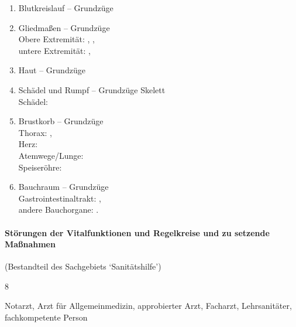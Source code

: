   \begin{enumerate}
    \item    Blutkreislauf -- Grundzüge \dotfill {}
    \item    Gliedmaßen -- Grundzüge
    \\
    Obere Extremität: \dotfill {},
    ,
    \\
    untere Extremität: \dotfill {},
    \item    Haut -- Grundzüge \dotfill {}
    \item    Schädel und Rumpf -- Grundzüge Skelett
    \\
    Schädel:  \dotfill {}
    \item    Brustkorb -- Grundzüge
    \\
    Thorax:  \dotfill {}, \\
    Herz:  \dotfill {} \\
    Atemwege/Lunge:  \dotfill {}\\
    Speiseröhre:  \dotfill {}
    \item    Bauchraum -- Grundzüge
    \\
    Gastrointestinaltrakt: \dotfill
    , \\
    andere Bauchorgane: \dotfill
    .
  \end{enumerate}
  

\paragraph{Störungen der  Vitalfunktionen  und Regelkreise und zu setzende Maßnahmen}
(Bestandteil des  Sachgebiets  \enquote*{Sanitätshilfe})
  
  \begin{inparadesc}
    \item[Stundenanzahl:]  8
    \item[Lehrkraft:]  Notarzt, Arzt für Allgemeinmedizin, approbierter Arzt,
    Facharzt,  Lehrsanitäter,  fachkompetente Person
  \end{inparadesc}
  
